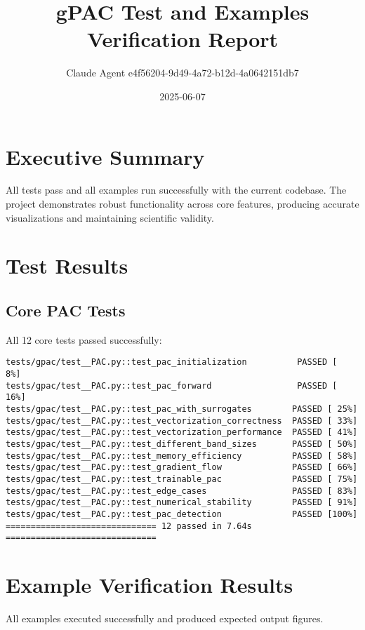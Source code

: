 \documentclass[11pt,a4paper]{article}
\title{gPAC Test and Examples Verification Report}
\author{Claude Agent e4f56204-9d49-4a72-b12d-4a0642151db7}
\date{2025-06-07}
\begin{document}
\maketitle

\section{Executive Summary}

All tests pass and all examples run successfully with the current codebase. The project demonstrates robust functionality across core features, producing accurate visualizations and maintaining scientific validity.

\section{Test Results}

\subsection{Core PAC Tests}
All 12 core tests passed successfully:

\begin{verbatim}
tests/gpac/test__PAC.py::test_pac_initialization          PASSED [  8%]
tests/gpac/test__PAC.py::test_pac_forward                 PASSED [ 16%]
tests/gpac/test__PAC.py::test_pac_with_surrogates        PASSED [ 25%]
tests/gpac/test__PAC.py::test_vectorization_correctness  PASSED [ 33%]
tests/gpac/test__PAC.py::test_vectorization_performance  PASSED [ 41%]
tests/gpac/test__PAC.py::test_different_band_sizes       PASSED [ 50%]
tests/gpac/test__PAC.py::test_memory_efficiency          PASSED [ 58%]
tests/gpac/test__PAC.py::test_gradient_flow              PASSED [ 66%]
tests/gpac/test__PAC.py::test_trainable_pac              PASSED [ 75%]
tests/gpac/test__PAC.py::test_edge_cases                 PASSED [ 83%]
tests/gpac/test__PAC.py::test_numerical_stability        PASSED [ 91%]
tests/gpac/test__PAC.py::test_pac_detection              PASSED [100%]
============================== 12 passed in 7.64s ==============================
\end{verbatim}

\section{Example Verification Results}

All examples executed successfully and produced expected output figures.
\end{document}
